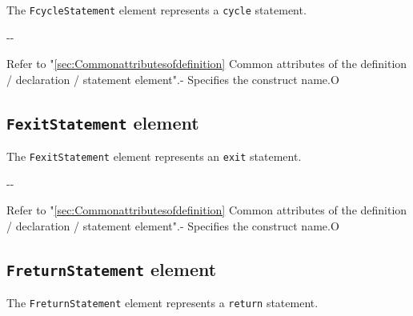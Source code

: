 The {\tt FcycleStatement} element represents a {\tt cycle} statement.


\begin{XcodeMLChildElements}
\XcodeMLElementDef{-}
{-}{-}
\end{XcodeMLChildElements}

\begin{XcodeMLAttributes}
{Refer to "\ref{sec:Commonattributesofdefinition} Common attributes of the definition / declaration / statement element".}{-}
{Specifies the construct name.}{O}
\end{XcodeMLAttributes}


\subsection{ {\tt FexitStatement} element}

The {\tt FexitStatement} element represents an {\tt exit} statement.


\begin{XcodeMLChildElements}
\XcodeMLElementDef{-}
{-}{-}
\end{XcodeMLChildElements}

\begin{XcodeMLAttributes}
{Refer to "\ref{sec:Commonattributesofdefinition} Common attributes of the definition / declaration / statement element".}{-}
{Specifies the construct name.}{O}
\end{XcodeMLAttributes}


\subsection{ {\tt FreturnStatement} element}

The {\tt FreturnStatement} element represents a {\tt return} statement.

